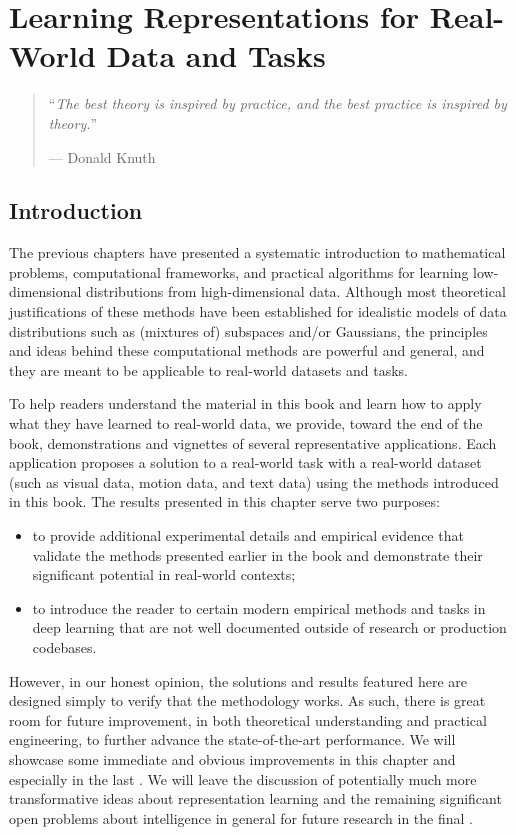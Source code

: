 \documentclass[../../book-main.tex]{subfiles}
\begin{document}
\chapter{Learning Representations for Real-World Data and Tasks}
\label{ch:applications}

\begin{quote}
    \hfill ``\textit{The best theory is inspired by practice, and the
    best practice is inspired by theory.}''

    \hfill --- Donald Knuth
\end{quote}

\section{Introduction}
The previous chapters have presented a systematic introduction to
mathematical problems, computational frameworks, and practical
algorithms for learning low-dimensional distributions from
high-dimensional data. Although most theoretical justifications of
these methods have been established for idealistic models of data
distributions such as (mixtures of) subspaces and/or Gaussians, the
principles and ideas behind these computational methods are powerful
and general, and they are meant to be applicable to real-world
datasets and tasks.

To help readers understand the material in this book and learn how to
apply what they have learned to real-world data, we provide, toward the
end of the book, demonstrations and vignettes of several representative
applications. Each application proposes a solution to a real-world task
with a real-world dataset (such as visual data, motion data, and text
data) using the methods introduced in this book. The results presented
in this chapter serve two purposes:
\begin{itemize}
    \item to provide additional experimental details and empirical
        evidence that validate the methods presented earlier in the
        book and demonstrate their significant potential in real-world
        contexts;
    \item to introduce the reader to certain modern empirical methods
        and tasks in deep learning that are not well documented outside
        of research or production codebases.
\end{itemize}
However, in our honest opinion, the solutions and results featured here
are designed simply to verify that the methodology works. As such,
there is great room for future improvement, in both theoretical
understanding and practical engineering, to further advance the
state-of-the-art performance. We will showcase some immediate and
obvious improvements in this chapter and especially in the last
. We will leave the discussion of potentially much
more transformative ideas about representation learning and the
remaining significant open problems about intelligence in general for
future research in the final .
\end{document}
